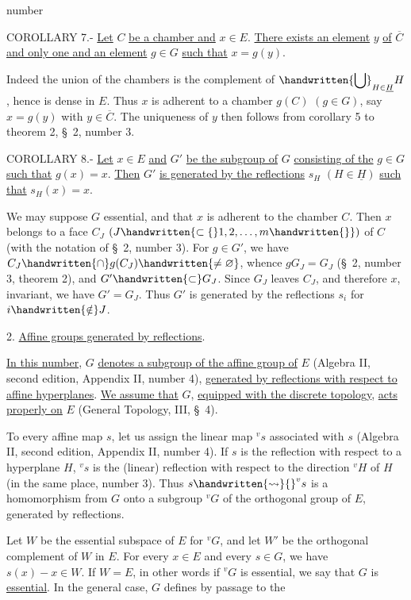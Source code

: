 \begin{flushright}number \end{flushright}
COROLLARY 7.- \uline{Let} $C$ \uline{be a chamber and} $x\in E$. \uline{There exists an element} $y$ \uline{of} $\overline{C}$ \uline{and only one and an element} $g\in G$ \uline{such that} $x=g(y)$.

Indeed the union of the chambers is the complement of $\displaystyle\handwritten{\bigcup}_{H\in\underline{H}}H$, hence is dense in $E$. Thus $x$ is adherent to a chamber $g(C)$ $(g\in G)$, say $x=g(y)$ with $y\in\overline{C}$. The uniqueness of $y$ then follows from corollary 5 to theorem 2, \S\ 2, number 3.

COROLLARY 8.- \uline{Let} $x\in E$ \uline{and} $G'$ \uline{be the subgroup of} $G$ \uline{consisting of the} $g\in G$ \uline{such that} $g(x)=x$. \uline{Then} $G'$ \uline{is generated by the reflections} $s_H$ $(H\in\underline{H})$ \uline{such that} $s_H(x)=x$.

We may suppose $G$ essential, and that $x$ is adherent to the chamber $C$. Then $x$ belongs to a face $C_J$ $(J\handwritten{\subset\{}1,2,\ldots,m\handwritten{\}})$ of $C$ (with the notation of \S\ 2, number 3). For $g\in G'$, we have $C_J\handwritten{\cap}g(C_J)\handwritten{\ne\varnothing}$, whence $gG_J=G_J$ (\S\ 2, number 3, theorem 2), and $G'\handwritten{\subset}G_J$. Since $G_J$ leaves $C_J$, and therefore $x$, invariant, we have $G'=G_J$. Thus $G'$ is generated by the reflections $s_i$ for $i\handwritten{\notin}J$.

2. \uline{Affine groups generated by reflections}.

\uline{In this number}, $G$ \uline{denotes a subgroup of the affine group of} $E$ (Algebra II, second edition, Appendix II, number 4), \uline{generated by reflections with respect to affine hyperplanes}. \uline{We assume that} $G$, \uline{equipped with the discrete topology}, \uline{acts properly on} $E$ (General Topology, III, \S\ 4).

To every affine map $s$, let us assign the linear map ${}^vs$ associated with $s$ (Algebra II, second edition, Appendix II, number 4). If $s$ is the reflection with respect to a hyperplane $H$, ${}^vs$ is the (linear) reflection with respect to the direction ${}^vH$ of $H$ (in the same place, number 3). Thus $s\handwritten{\rightsquigarrow}{}^vs$ is a homomorphism from $G$ onto a subgroup ${}^vG$ of the orthogonal group of $E$, generated by reflections.

Let $W$ be the essential subspace of $E$ for ${}^vG$, and let $W'$ be the orthogonal complement of $W$ in $E$. For every $x\in E$ and every $s\in G$, we have $s(x)-x\in W$. If $W=E$, in other words if ${}^vG$ is essential, we say that $G$ is \uline{essential}. In the general case, $G$ defines by passage to the

